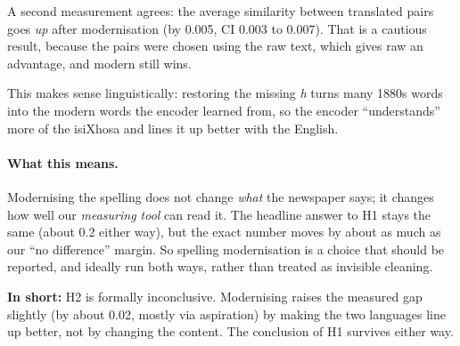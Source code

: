 \documentclass[11pt,a4paper]{article}
\newcommand{\takeaway}[1]{\par\smallskip\noindent\colorbox{black!6}{\parbox{\dimexpr\linewidth-2\fboxsep}{\textbf{In short:} #1}}\par\smallskip}
\begin{document}
A second measurement agrees: the average similarity between translated pairs goes \emph{up} after
modernisation (by 0.005, CI 0.003 to 0.007). That is a cautious result, because the pairs were
chosen using the raw text, which gives raw an advantage, and modern still wins.

This makes sense linguistically: restoring the missing \emph{h} turns many 1880s words into the
modern words the encoder learned from, so the encoder ``understands'' more of the isiXhosa and lines it
up better with the English.

\paragraph{What this means.} Modernising the spelling does not change \emph{what} the newspaper says;
it changes how well our \emph{measuring tool} can read it. The headline answer to H1 stays the same
(about 0.2 either way), but the exact number moves by about as much as our ``no difference'' margin.
So spelling modernisation is a choice that should be reported, and ideally run both ways, rather than
treated as invisible cleaning.

\takeaway{H2 is formally inconclusive. Modernising raises the measured gap slightly (by about 0.02,
mostly via aspiration) by making the two languages line up better, not by changing the content. The
conclusion of H1 survives either way.}
\end{document}
